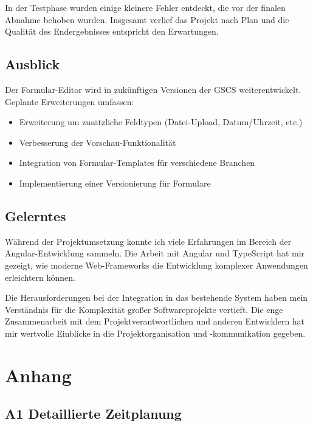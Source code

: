 \documentclass[a4paper,11pt]{article}
\begin{document}
In der Testphase wurden einige kleinere Fehler entdeckt, die vor der finalen Abnahme behoben wurden. Insgesamt verlief das Projekt nach Plan und die Qualität des Endergebnisses entspricht den Erwartungen.

\subsection{Ausblick}

Der Formular-Editor wird in zukünftigen Versionen der GSCS weiterentwickelt. Geplante Erweiterungen umfassen:

\begin{itemize}
\item Erweiterung um zusätzliche Feldtypen (Datei-Upload, Datum/Uhrzeit, etc.)
\item Verbesserung der Vorschau-Funktionalität
\item Integration von Formular-Templates für verschiedene Branchen
\item Implementierung einer Versionierung für Formulare
\end{itemize}

\subsection{Gelerntes}

Während der Projektumsetzung konnte ich viele Erfahrungen im Bereich der Angular-Entwicklung sammeln. Die Arbeit mit Angular und TypeScript hat mir gezeigt, wie moderne Web-Frameworks die Entwicklung komplexer Anwendungen erleichtern können.

Die Herausforderungen bei der Integration in das bestehende System haben mein Verständnis für die Komplexität großer Softwareprojekte vertieft. Die enge Zusammenarbeit mit dem Projektverantwortlichen und anderen Entwicklern hat mir wertvolle Einblicke in die Projektorganisation und -kommunikation gegeben.

\newpage
\appendix
\section{Anhang}

\subsection{A1 Detaillierte Zeitplanung}
\end{document}
